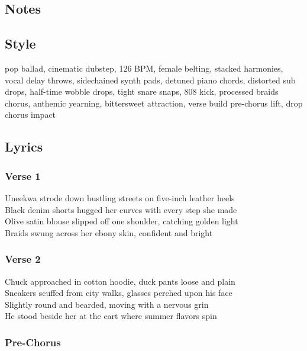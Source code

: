 \subsection{Notes}\label{notes-40}

\subsection{Style}\label{style-39}

pop ballad, cinematic dubstep, 126 BPM, female belting, stacked
harmonies, vocal delay throws, sidechained synth pads, detuned piano
chords, distorted sub drops, half-time wobble drops, tight snare snaps,
808 kick, processed braids chorus, anthemic yearning, bittersweet
attraction, verse build pre-chorus lift, drop chorus impact

\subsection{Lyrics}\label{lyrics-39}

\subsubsection{Verse 1}\label{verse-1-22}

Uneekwa strode down bustling streets on five-inch leather heels\\
Black denim shorts hugged her curves with every step she made\\
Olive satin blouse slipped off one shoulder, catching golden light\\
Braids swung across her ebony skin, confident and bright

\subsubsection{Verse 2}\label{verse-2-23}

Chuck approached in cotton hoodie, duck pants loose and plain\\
Sneakers scuffed from city walks, glasses perched upon his face\\
Slightly round and bearded, moving with a nervous grin\\
He stood beside her at the cart where summer flavors spin

\subsubsection{Pre-Chorus}\label{pre-chorus-25}

